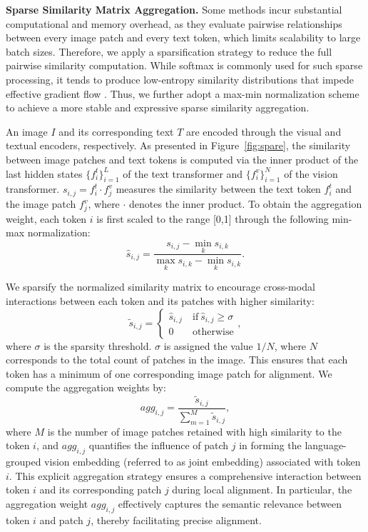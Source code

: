 \documentclass[acmsmall]{acmart}
\begin{document}
{\bfseries Sparse Similarity Matrix Aggregation.} Some methods
\cite{mukhoti2023open, yao2021filip} incur substantial computational
and memory overhead, as they evaluate pairwise relationships between
every image patch and every text token, which limits scalability to
large batch sizes. Therefore, we apply a sparsification strategy to
reduce the full pairwise similarity computation. While softmax is
commonly used for such sparse processing, it tends to produce
low-entropy similarity distributions that impede effective gradient
flow \cite{hoffmann2023eureka}. Thus, we further adopt a max-min
normalization scheme to achieve a more stable and expressive sparse
similarity aggregation.

An image $I$ and its corresponding text $T$ are encoded through the
visual and textual encoders, respectively. As presented in
Figure~\ref{fig:spare}, the similarity between image patches and
text tokens is computed via the inner product of the last hidden
states $\{f_i^t\}_{i=1}^L$ of the text transformer and
$\{f_i^v\}_{i=1}^N$ of the vision transformer. $s_{i,j}=f_i^t \cdot
f_j^v$ measures the similarity between the text token $f_i^t$ and
the image patch $f_j^v$, where $\cdot$ denotes the inner product. To
obtain the aggregation weight, each token $i$ is first scaled to the
range [0,1] through the following min-max normalization:
\begin{equation}
    \hat{s}_{i,j}=\frac{s_{i,j}-\min_k s_{i,k}}{\max_k s_{i,k}-\min_k s_{i,k}}.
    \label{eq:minmax}
\end{equation}

We sparsify the normalized similarity matrix to encourage
cross-modal interactions between each token and its patches with
higher similarity:
\begin{equation}
    \tilde{s}_{i,j}=
\begin{cases}
\hat{s}_{i,j} & \mathrm{~if~}\hat{s}_{i,j}\geq\sigma \\
0 & \mathrm{~otherwise}
\end{cases},
\label{eq:threshold}
\end{equation}
where $\sigma$ is the sparsity threshold. $\sigma$ is assigned the
value $1/N$, where $N$ corresponds to the total count of patches in
the image. This ensures that each token has a minimum of one
corresponding image patch for alignment. We compute the aggregation
weights by:
\begin{equation}
    agg_{i,j}=\frac{\tilde{s}_{i,j}}{\sum_{m=1}^M\tilde{s}_{i,j}},
    \label{eq:agg_weight}
\end{equation}
where $M$ is the number of image patches retained with high
similarity to the token $i$, and $agg_{i,j}$ quantifies the
influence of patch $j$ in forming the language-grouped vision
embedding (referred to as joint embedding) associated with token
$i$. This explicit aggregation strategy ensures a comprehensive
interaction between token $i$ and its corresponding patch $j$ during
local alignment. In particular, the aggregation weight $agg_{i,j}$
effectively captures the semantic relevance between token $i$ and
patch $j$, thereby facilitating precise alignment.
\end{document}
